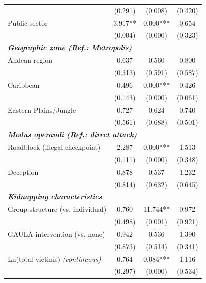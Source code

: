 \documentclass[12pt,a4paper]{article}
\theoremstyle{plain}
\theoremstyle{definition}
\theoremstyle{remark}
\newcommand{\1}{\mathbf{1}}
\begin{document}
{\begin{longtable}{p{}ccc}
                          & {\scriptsize (0.291)} & {\scriptsize (0.008)} & {\scriptsize (0.420)} \\
    Public sector & 3.917** & 0.000*** & 0.654 \\
                  & {\scriptsize (0.004)} & {\scriptsize (0.000)} & {\scriptsize (0.323)} \\
    \midrule
    \multicolumn{4}{l}{\textbf{\textit{Geographic zone (Ref.: Metropolis)}}} \\
    Andean region & 0.637 & 0.560 & 0.800 \\
                  & {\scriptsize (0.313)} & {\scriptsize (0.591)} & {\scriptsize (0.587)} \\
    Caribbean & 0.496 & 0.000*** & 0.426 \\
              & {\scriptsize (0.143)} & {\scriptsize (0.000)} & {\scriptsize (0.061)} \\
    Eastern Plains/Jungle & 0.727 & 0.624 & 0.740 \\
                          & {\scriptsize (0.561)} & {\scriptsize (0.688)} & {\scriptsize (0.501)} \\
    \midrule
    \multicolumn{4}{l}{\textbf{\textit{Modus operandi (Ref.: direct attack)}}} \\
    Roadblock (illegal checkpoint) & 2.287 & 0.000*** & 1.513 \\
                                  & {\scriptsize (0.111)} & {\scriptsize (0.000)} & {\scriptsize (0.348)} \\
    Deception & 0.878 & 0.537 & 1.232 \\
              & {\scriptsize (0.814)} & {\scriptsize (0.632)} & {\scriptsize (0.645)} \\
    \midrule
    \multicolumn{4}{l}{\textbf{\textit{Kidnapping characteristics}}} \\
    Group structure (vs. individual) & 0.760 & 11.744** & 0.972 \\
                                    & {\scriptsize (0.498)} & {\scriptsize (0.001)} & {\scriptsize (0.921)} \\
    GAULA intervention (vs. none) & 0.942 & 0.536 & 1.390 \\
                                 & {\scriptsize (0.873)} & {\scriptsize (0.514)} & {\scriptsize (0.341)} \\
    Ln(total victims) \textit{(continuous)} & 0.764 & 0.084*** & 1.116 \\
                                            & {\scriptsize (0.297)} & {\scriptsize (0.000)} & {\scriptsize (0.534)} \\

\end{longtable}}
\end{document}
